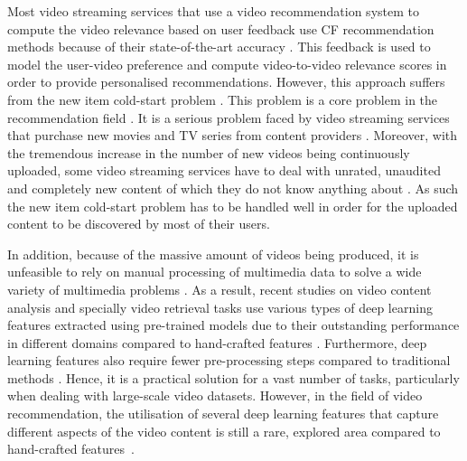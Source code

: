 \documentclass[review]{elsarticle}
\begin{document}
Most video streaming services that use a video recommendation system to compute the video relevance based on user feedback \citep{liu2018content} use \ac{CF} recommendation methods because of their state-of-the-art accuracy \citep{deldjoo2019movie,yuan2016solving}. This feedback is used to model the user-video preference and compute video-to-video relevance scores in order to provide personalised recommendations. However, this approach suffers from the new item cold-start problem \citep{wei2017collaborative, deldjoo2019movie}. This problem is a core problem in the recommendation field \citep{wang2019overview,elahi2019user,volkovs2017dropoutnet}. It is a serious problem faced by video streaming services that purchase new movies and TV series from content providers \citep{liu2018content,wang2019overview}. Moreover, with the tremendous increase in the number of new videos being continuously uploaded, some video streaming services have to deal with unrated, unaudited and completely new content of which they do not know anything about \citep{kumar2018icebreaker}. As such the new item cold-start problem has to be handled well in order for the uploaded content to be discovered by most of their users.

In addition, because of the massive amount of videos being produced, it is unfeasible to rely on manual processing of multimedia data to solve a wide variety of multimedia problems \citep{shen2020advance}. As a result, recent studies on video content analysis and specially video retrieval tasks use various types of deep learning features extracted using pre-trained models due to their outstanding performance in different domains compared to hand-crafted features \citep{shen2020advance, tran2015learning, liu2019use, miech2019howto100m}. Furthermore, deep learning features also require fewer pre-processing steps compared to traditional methods \citep{shen2020advance}. Hence, it is a practical solution for a vast number of tasks, particularly when dealing with large-scale video datasets. However, in the field of video recommendation, the utilisation of several deep learning features that capture different aspects of the video content is still a rare, explored area compared to hand-crafted features~\citep{deldjoo2020recommender}.
\end{document}
